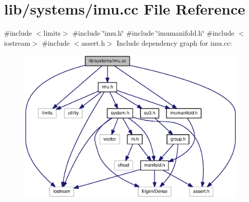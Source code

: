 \section{lib/systems/imu.cc \-File \-Reference}
\label{imu_8cc}
{\ttfamily \#include $<$limits$>$}\*
{\ttfamily \#include \char`\"{}imu.\-h\char`\"{}}\*
{\ttfamily \#include \char`\"{}imumanifold.\-h\char`\"{}}\*
{\ttfamily \#include $<$iostream$>$}\*
{\ttfamily \#include $<$assert.\-h$>$}\*
\-Include dependency graph for imu.\-cc\-:
\nopagebreak
\begin{figure}[H]
\begin{center}
\leavevmode
\includegraphics[width=350pt]{imu_8cc__incl}
\end{center}
\end{figure}
